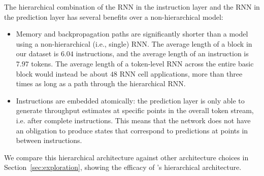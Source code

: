 The hierarchical combination of the RNN in the instruction layer and the RNN in the prediction layer has several benefits over a non-hierarchical model:
\begin{itemize}
\item Memory and backpropagation paths are significantly shorter than a model using a non-hierarchical (i.e., single) RNN.
  The average length of a block in our dataset is $6.04$ instructions, and the average length of an instruction is $7.97$ tokens.
  The average length of a token-level RNN across the entire basic block would instead be about $48$ RNN cell applications, more than three times as long as a path through the hierarchical RNN.
\item
  Instructions are embedded atomically: the prediction layer is only able to generate throughput estimates at specific points in the overall token stream, i.e. after complete instructions.
  This means that the network does not have an obligation to produce states that correspond to predictions at points in between instructions.
\end{itemize}
We compare this hierarchical architecture against other architecture choices in Section~\ref{sec:exploration}, showing the efficacy of \tool{}'s hierarchical architecture.
